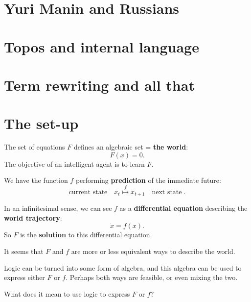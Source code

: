 \section{Yuri Manin and Russians}



\section{Topos and internal language}

\section{Term rewriting and all that}



\section{The set-up}

The set of equations $F$ defines an algebraic set = \textbf{the world}:
\begin{equation}
F(x) = 0 .
\end{equation}
The objective of an intelligent agent is to learn $F$.

We have the function $f$ performing \textbf{prediction} of the immediate future:
\begin{equation}
\boxed{\mbox{current state}} \quad x_t \stackrel{f}{\mapsto} x_{t+1} \quad \boxed{\mbox{next state}} \;.
\end{equation}

In an infinitesimal sense, we can see $f$ as a \textbf{differential equation} describing the \textbf{world trajectory}:
\begin{equation}
\dot{x} = f(x) .
\end{equation}
So $F$ is the \textbf{solution} to this differential equation.

It seems that $F$ and $f$ are more or less equivalent ways to describe the world.

Logic can be turned into some form of algebra, and this algebra can be used to express either $F$ or $f$.  Perhaps both ways are feasible, or even mixing the two.

What does it mean to use logic to express $F$ or $f$?

